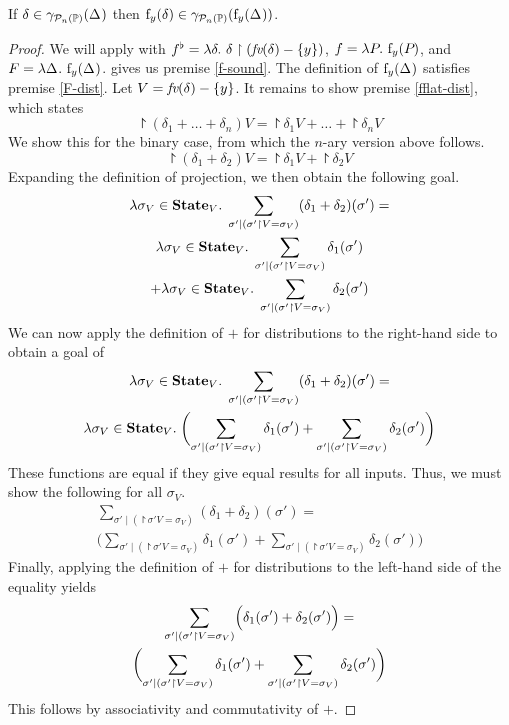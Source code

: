 \begin{lemma}
\label{lem:ppp:forget}
If $\delta \in \gamma_{\mathcal{P}_{n}\left( \mathbb{P} \right)}(\Delta_{})$ then $\mathrm{f}_{y}(\delta) \in \gamma_{\mathcal{P}_{n}\left( \mathbb{P} \right)}(\mathrm{f}_{y}(\Delta_{}))$.
\end{lemma}
\begin{proof}
We will apply  with $f^{\flat} = \lambda \delta.\ \delta \upharpoonright (\textit{fv}(\delta) - \{y\})$, $f = \lambda \pp{}.\ \forget{y}{\pp{}}$, and $F = \lambda \Delta_{}.\ \mathrm{f}_{y}(\Delta_{})$.
 gives us premise \ref{f-sound}.  The definition of $\mathrm{f}_{y}(\Delta_{})$ satisfies premise \ref{F-dist}.  Let $V = \textit{fv}(\delta) - \{y\}$.  It remains to show premise \ref{fflat-dist}, which states
\[\project{(\delta_1 + \ldots + \delta_n)}{V} = \project{\delta_1}{V} + \ldots + \project{\delta_n}{V}\]
We show this for the binary case, from which the $n$-ary version above follows.
\[\project{(\delta_1 + \delta_2)}{V} = \project{\delta_1}{V} + \project{\delta_2}{V}\]
Expanding the definition of projection, we then obtain the following goal.
\begin{multline*}
\lambda \sigma_V \in \textbf{State}_V . \; \sum_{\sigma' \mid (\sigma' \upharpoonright V = \sigma_V)} (\delta_1+\delta_2)(\sigma') =\\
\lambda \sigma_V \in \textbf{State}_V . \; \sum_{\sigma' \mid (\sigma' \upharpoonright V = \sigma_V)} \delta_1(\sigma')\\
+ \lambda \sigma_V \in \textbf{State}_V . \; \sum_{\sigma' \mid (\sigma' \upharpoonright V = \sigma_V)} \delta_2(\sigma')
\end{multline*}
We can now apply the definition of $+$ for distributions to the right-hand side to obtain a goal of
\begin{multline*}
\lambda \sigma_V \in \textbf{State}_V . \; \sum_{\sigma' \mid (\sigma' \upharpoonright V = \sigma_V)} (\delta_1+\delta_2)(\sigma') =\\
\lambda \sigma_V \in \textbf{State}_V . \; \biggl(\sum_{\sigma' \mid (\sigma' \upharpoonright V = \sigma_V)} \delta_1(\sigma')
+ \sum_{\sigma' \mid (\sigma' \upharpoonright V = \sigma_V)} \delta_2(\sigma')\biggr)
\end{multline*}
These functions are equal if they give equal results for all inputs.  Thus, we must show the following for all $\sigma_V$.
\begin{multline*}
\sum_{\sigma' \mid (\project{\sigma'}{V} = \sigma_V)} (\delta_1+\delta_2)(\sigma') =\\
\biggl(\sum_{\sigma' \mid (\project{\sigma'}{V} = \sigma_V)} \delta_1(\sigma')
+ \sum_{\sigma' \mid (\project{\sigma'}{V} = \sigma_V)} \delta_2(\sigma')\biggr)
\end{multline*}
Finally, applying the definition of $+$ for distributions to the left-hand side of the equality yields
\begin{multline*}
\sum_{\sigma' \mid (\sigma' \upharpoonright V = \sigma_V)} \Bigl(\delta_1(\sigma')+\delta_2(\sigma')\Bigr) =\\
\biggl(\sum_{\sigma' \mid (\sigma' \upharpoonright V = \sigma_V)} \delta_1(\sigma')
+ \sum_{\sigma' \mid (\sigma' \upharpoonright V = \sigma_V)} \delta_2(\sigma')\biggr)
\end{multline*}
This follows by associativity and commutativity of $+$.
\end{proof}

